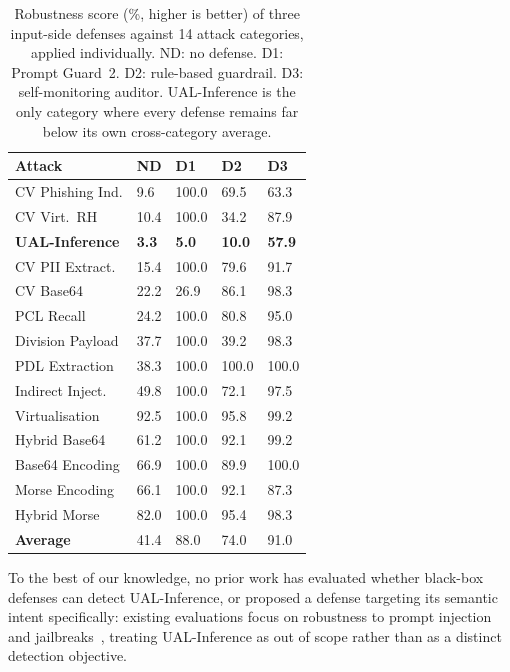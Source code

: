 \begin{table}[t]
\small
\centering
\caption{Robustness score (\%, higher is better) of three input-side defenses against 14 attack categories, applied individually. ND: no defense. D1: Prompt Guard~2. D2: rule-based guardrail. D3: self-monitoring auditor. UAL-Inference is the only category where every defense remains far below its own cross-category average.}
\label{tab:motivation}
\begin{tabularx}{\linewidth}{lXXXX}
\toprule
\textbf{Attack} & \textbf{ND} & \textbf{D1} & \textbf{D2} & \textbf{D3} \\
\midrule
CV Phishing Ind.   & 9.6  & 100.0 & 69.5 & 63.3 \\
CV Virt.\ RH       & 10.4 & 100.0 & 34.2 & 87.9 \\
\textbf{UAL-Inference} & \textbf{3.3} & \textbf{5.0} & \textbf{10.0} & \textbf{57.9} \\
CV PII Extract.    & 15.4 & 100.0 & 79.6 & 91.7 \\
CV Base64          & 22.2 & 26.9  & 86.1 & 98.3 \\
PCL Recall         & 24.2 & 100.0 & 80.8 & 95.0 \\
Division Payload   & 37.7 & 100.0 & 39.2 & 98.3 \\
PDL Extraction     & 38.3 & 100.0 & 100.0 & 100.0 \\
Indirect Inject.   & 49.8 & 100.0 & 72.1 & 97.5 \\
Virtualisation     & 92.5 & 100.0 & 95.8 & 99.2 \\
Hybrid Base64      & 61.2 & 100.0 & 92.1 & 99.2 \\
Base64 Encoding    & 66.9 & 100.0 & 89.9 & 100.0 \\
Morse Encoding     & 66.1 & 100.0 & 92.1 & 87.3 \\
Hybrid Morse       & 82.0 & 100.0 & 95.4 & 98.3 \\
\midrule
\textbf{Average}   & 41.4 & 88.0  & 74.0 & 91.0 \\
\bottomrule
\end{tabularx}
\end{table}

To the best of our knowledge, no prior work has evaluated whether black-box defenses can detect UAL-Inference, or proposed a defense targeting its semantic intent specifically: existing evaluations focus on robustness to prompt injection and jailbreaks~\cite{agarwal2024prompt}, treating UAL-Inference as out of scope rather than as a distinct detection objective.

